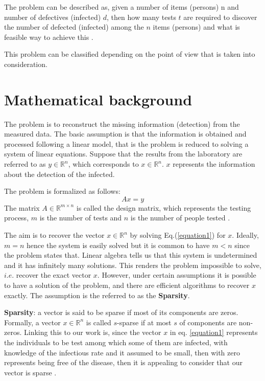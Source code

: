 The problem can be described as, given a number of items (persons) n and number of defectives (infected) $d$, then how many tests $t$ are required to discover the number of defected (infected) among the $n$ items (persons) and what is feasible way  to achieve this \cite{aldridge}.  

This problem can be classified depending on the point of view that is taken into consideration.


\section{Mathematical background}
The problem is to reconstruct the missing information (detection) from the measured data. The basic assumption is that the information is obtained and processed following a linear model, that is the problem is reduced to solving a system of linear equations. Suppose that the results from the laboratory are referred to as $ y \in \mathbb{R}^n $,  which corresponds to $ x \in \mathbb{R}^n $. $ x $ represents the information about the detection of the infected. 

The problem is formalized as follows: 
\begin{equation}\label{equation1}
Ax = y 
\end{equation} The matrix $ A \in \mathbb{R}^{m \times n}$ \quad is called the design matrix, which represents the testing process, $ m $ is the number of tests and $ n $ is the number of people tested \cite{mathbook}. 

The aim is to recover the vector $ x \in \mathbb{R}^n $ by solving  Eq.(\ref{equation1}) for $ x $. Ideally, $ m = n $ hence the system is easily solved but it is common to have $ m < n $ since the problem states that. Linear algebra tells us that this system is undetermined and it has infinitely many solutions. This renders the problem impossible to solve, $ i.e. $ recover the exact vector $ x $. However, under certain assumptions it is possible to have a solution of the problem, and there are efficient algorithms to recover $ x $ exactly. The assumption is the referred to as the \textbf{Sparsity}. 

\textbf{Sparsity}: a vector is said to be sparse if most of its components are zeros. Formally, a vector $ x \in \mathbb{R}^n $ \quad is called $ s$-sparse  if at most $ s $ of components are non-zeros.  Linking this to our work is, since the vector $ x $ in eq. \ref{equation1} represents the individuals to be test among which some of them are infected, with knowledge of the infectious rate and it assumed to be small, then with zero represents being free of the disease, then it is appealing to consider that our vector is sparse \cite{mathbook}. 

